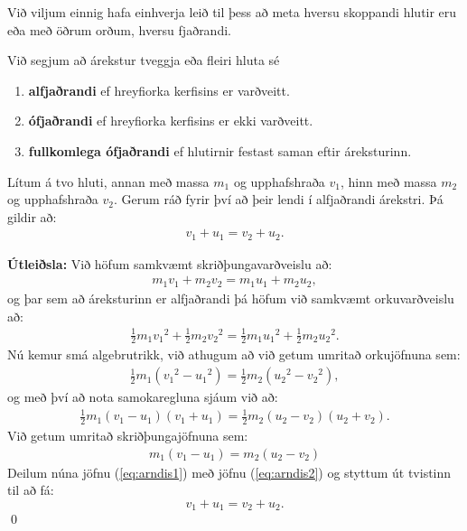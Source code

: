 Við viljum einnig hafa einhverja leið til þess að meta hversu skoppandi hlutir eru eða með öðrum orðum, hversu fjaðrandi.

\begin{tcolorbox}
\begin{definition}
Við segjum að árekstur tveggja eða fleiri hluta sé
\begin{enumerate}[label = \textbf{(\roman*)}]
    \item \textbf{alfjaðrandi} ef hreyfiorka kerfisins er varðveitt.
    \item \textbf{ófjaðrandi} ef hreyfiorka kerfisins er ekki varðveitt.
    \item \textbf{fullkomlega ófjaðrandi} ef hlutirnir festast saman eftir áreksturinn.
\end{enumerate}
\end{definition}
\end{tcolorbox}



\begin{tcolorbox}
\begin{theorem}
Lítum á tvo hluti, annan með massa $m_1$ og upphafshraða $v_1$, hinn með massa $m_2$ og upphafshraða $v_2$. Gerum ráð fyrir því að þeir lendi í alfjaðrandi árekstri. Þá gildir að:
\begin{align*}
    v_1 + u_1 = v_2 + u_2.
\end{align*}
\end{theorem}
\end{tcolorbox}

\textbf{Útleiðsla:} Við höfum samkvæmt skriðþungavarðveislu að:
\begin{align*}
    m_1 v_1 + m_2 v_2 = m_1 u_1 + m_2 u_2,
\end{align*}
og þar sem að áreksturinn er alfjaðrandi þá höfum við samkvæmt orkuvarðveislu að:
\begin{align*}
    \frac{1}{2}m_1 {v_{1}}^2 + \frac{1}{2}m_2 {v_{2}}^2 = \frac{1}{2}m_1 {u_{1}}^2 + \frac{1}{2}m_2 {u_{2}}^2.
\end{align*}
Nú kemur smá algebrutrikk, við athugum að við getum umritað orkujöfnuna sem:
\begin{align*}
    \frac{1}{2}m_1\left({v_1}^2 - {u_1}^2 \right) = \frac{1}{2}m_2 \left( {u_2}^2 - {v_2}^2 \right),
\end{align*}
og með því að nota samokaregluna sjáum við að:
\begin{align} \label{eq:arndis1}
    \frac{1}{2}m_1 \left( v_1 - u_1 \right)\left( v_1 + u_1 \right) = \frac{1}{2}m_2 \left( u_2 - v_2 \right) \left( u_2 + v_2 \right).
\end{align}
Við getum umritað skriðþungajöfnuna sem:
\begin{align} \label{eq:arndis2}
    m_1 \left( v_1 - u_1 \right) = m_2 \left( u_2 - v_2 \right)
\end{align}
Deilum núna jöfnu (\ref{eq:arndis1}) með jöfnu (\ref{eq:arndis2}) og styttum út tvistinn til að fá:
\begin{equation*}
    v_1 + u_1 = v_2 + u_2.
\end{equation*}
\qed

